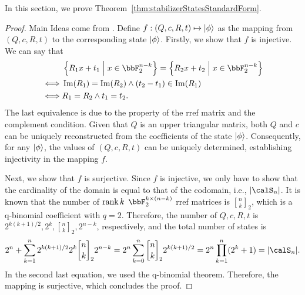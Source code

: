 \documentclass[a4paper, onecolumn, 11pt, longbibliography]{quantumarticle}
\newcommand{\qBinom}[2]{\genfrac{[}{]}{0pt}{}{#1}{#2}}
\begin{document}
In this section, we prove Theorem~\ref{thm:stabilizerStatesStandardForm}.
\stabilizerStatesStandardForm*
\begin{proof}
  Main Ideas come from \cite{struchalinExperimentalEstimationQuantum2021b}.
  Define $f: (Q,c,R,t) \mapsto \ket{\phi}$ as the mapping from $(Q,c,R,t)$ to the corresponding state $\ket{\phi}$.
  Firstly, we show that $f$ is injective.
  We can say that
  \begin{align*}
         & \left\{R_1 x + t_1 \;\middle|\; x \in \bbF_2^{n-k} \right\} = \left\{R_2 x + t_2 \;\middle|\; x \in \bbF_2^{n-k} \right\} \\
    \iff & \Im(R_1)=\Im(R_2) \land (t_2-t_1) \in \Im(R_1)                                                                            \\
    \iff & R_1 = R_2 \land t_1 = t_2.
  \end{align*}
  The last equivalence is due to the
  property of the rref matrix and the complement condition.
  Given that $Q$ is an upper triangular matrix,
  both $Q$ and $c$ can be uniquely reconstructed from the coefficients of the state $\ket{\phi}$. Consequently, for any $\ket{\phi}$, the values of $(Q,c,R,t)$ can be uniquely determined, establishing injectivity in the mapping $f$.

  Next, we show that $f$ is surjective.
  Since $f$ is injective, we only have to show
  that the cardinality of the domain is equal to that of the codomain, i.e., $\abs{\calS_n}$.
  It is known that the number of $\rank k$ $\bbF_2^{k \times (n-k)}$ rref matrices is
  $\qBinom{n}{k}_2$, which is a q-binomial coefficient with $q=2$.
  Therefore, the number of $Q,c,R,t$ is
  $2^{k(k+1)/2},2^k,\qBinom{n}{k}_2,2^{n-k}$, respectively,
  and the total number of states is
  \begin{equation*}
    2^n + \sum_{k=1}^{n} 2^{k(k+1)/2} 2^k \qBinom{n}{k}_2 2^{n-k} \\
    = 2^n \sum_{k=0}^{n} \qBinom{n}{k}_2 2^{k(k+1)/2}               \\
    = 2^n \prod_{k=1}^{n} (2^k+1)
    = \abs{\calS_n}.
  \end{equation*}
  In the second last equation, we used the q-binomial theorem.
  Therefore, the mapping is surjective, which concludes the proof.
\end{proof}
\end{document}
